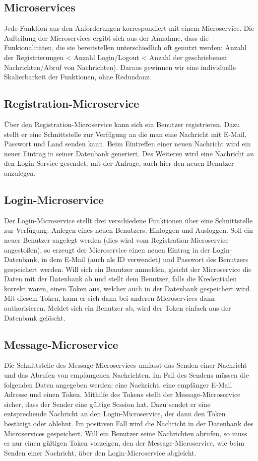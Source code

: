 \subsection{Microservices}
Jede Funktion aus den Anforderungen korrespondiert mit einem Microservice. Die Aufteilung der Microservices ergibt sich aus der Annahme, dass die Funkionalitäten, die sie bereitstellen unterschiedlich oft genutzt werden: Anzahl der Registrierungen < Anzahl Login/Logout < Anzahl der geschriebenen Nachrichten/Abruf von Nachrichten). Daraus gewinnen wir eine individuelle Skalierbarkeit der Funktionen, ohne Redundanz.

\subsection{Registration-Microservice}
Über den Registration-Microservice kann sich ein Benutzer registrieren. Dazu stellt er eine Schnittstelle zur Verfügung an die man eine Nachricht mit E-Mail, Passwort und Land senden kann. Beim Eintreffen einer neuen Nachricht wird ein neuer Eintrag in seiner Datenbank generiert. Des Weiteren wird eine Nachricht an den Login-Service gesendet, mit der Anfrage, auch hier den neuen Benutzer anzulegen.

\subsection{Login-Microservice}
Der Login-Microservice stellt drei verschiedene Funktionen über eine Schnittstelle zur Verfügung: Anlegen eines neuen Benutzers, Einloggen und Ausloggen. Soll ein neuer Benutzer angelegt werden (dies wird vom Registration-Microservice angestoßen), so erzeugt der Microservice einen neuen Eintrag in der Login-Datenbank, in dem E-Mail (auch als ID verwendet) und Passwort des Benutzers gespeichert werden. Will sich ein Benutzer anmelden, gleicht der Microservice die Daten mit der Datenbank ab und stellt dem Benutzer, falls die Kredentialen korrekt waren, einen Token aus, welcher auch in der Datenbank gespeichert wird. Mit diesem Token, kann er sich dann bei anderen Microservices dann authorisieren. Meldet sich ein Benutzer ab, wird der Token einfach aus der Datenbank gelöscht.

\subsection{Message-Microservice}
Die Schnittstelle des Message-Microservices umfasst das Senden einer Nachricht und das Abrufen von empfangenen Nachrichten. Im Fall des Sendens müssen die folgenden Daten angegeben werden: eine Nachricht, eine empfänger E-Mail Adresse und einen Token. Mithilfe des Tokens stellt der Message-Microservice sicher, dass der Sender eine gültige Session hat. Dazu sendet er eine entsprechende Nachricht an den Login-Microservice, der dann den Token bestätigt oder ablehnt. Im positiven Fall wird die Nachricht in der Datenbank des Microservices gespeichert. Will ein Benutzer seine Nachrichten abrufen, so muss er nur einen gültigen Token vorzeigen, den der Message-Microservice, wie beim Senden einer Nachricht, über den Login-Microservice abgleicht.

